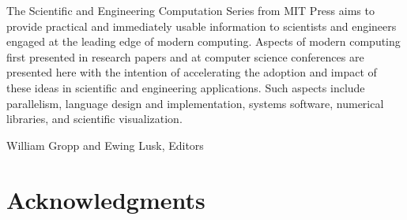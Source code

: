  
 

\cleardoublepage
\seriesforward

\noindent 
The Scientific and Engineering Computation Series from MIT Press aims to
provide practical and immediately usable information to scientists and
engineers engaged at the leading edge of modern computing.  Aspects of
modern computing first presented in research papers and at computer
science conferences are presented here
with the intention of accelerating the adoption and impact of these ideas in
scientific and engineering applications.  Such aspects include
parallelism, language design and implementation, systems software,
numerical libraries, and scientific visualization.

\vspace{2pc}
\noindent
William Gropp and Ewing Lusk, Editors\\



\noindent 

 
 


\section*{Acknowledgments}

%
%


% 
 
\secondbooktitlepage
 
